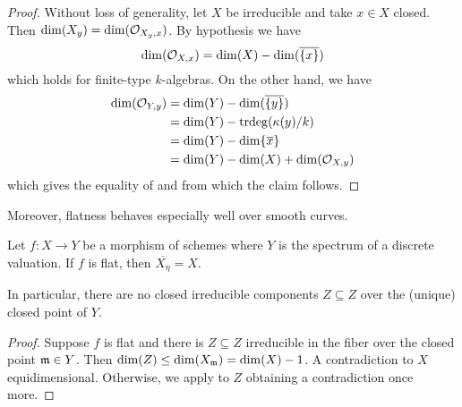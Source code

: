 \begin{proof}
    Without loss of generality, let $X$ be irreducible and take $x\in X$ closed. Then $\dim(X_{y})=\dim(\mathcal{O}_{X_{y},x})$. By hypothesis we have 
    $$\dim(\mathcal{O}_{X,x})=\dim(X)-\dim(\overline{\{x\}})$$
    which holds for finite-type $k$-algebras. On the other hand, we have 
    \begin{align*}
        \dim(\mathcal{O}_{Y,y}) &= \dim(Y)-\dim(\overline{\{y\}}) \\
        &= \dim(Y)-\mathrm{trdeg}(\kappa(y)/k) \\
        &= \dim(Y)-\dim\{\overline{x}\} \\
        &= \dim(Y)-\dim(X)+\dim(\mathcal{O}_{X,y})
    \end{align*}
    which gives the equality of  and from which the claim follows. 
\end{proof}
Moreover, flatness behaves especially well over smooth curves. 
\begin{proposition}\label{prop: flatness over curves}
    Let $f:X\to Y$ be a morphism of schemes where $Y$ is the spectrum of a discrete valuation. If $f$ is flat, then $\overline{X_{\eta}}=X$. 
\end{proposition}
In particular, there are no closed irreducible components $Z\subseteq Z$ over the (unique) closed point of $Y$. 
\begin{proof}
    Suppose $f$ is flat and there is $Z\subseteq Z$ irreducible in the fiber over the closed point $\mathfrak{m}\in Y$. Then $\dim(Z)\leq \dim(X_{\mathfrak{m}})=\dim(X)-1$. A contradiction to $X$ equidimensional. Otherwise, we apply  to $Z$ obtaining a contradiction once more. 
\end{proof}